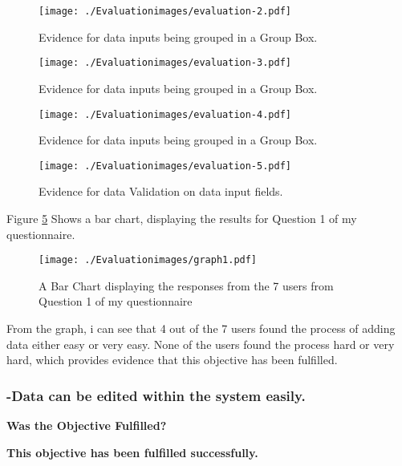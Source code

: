 \begin{figure}[H]
\caption{Evidence for data inputs being grouped in a Group Box.} \label{fig:evaluation-2}
\hfill\texttt{[image: ./Evaluationimages/evaluation-2.pdf]}
\end{figure}

\begin{figure}[H]
\caption{Evidence for data inputs being grouped in a Group Box.} \label{fig:evaluation-3}
\hfill\texttt{[image: ./Evaluationimages/evaluation-3.pdf]}
\end{figure}

\begin{figure}[H]
\caption{Evidence for data inputs being grouped in a Group Box.} \label{fig:evaluation-4}
\hfill\texttt{[image: ./Evaluationimages/evaluation-4.pdf]}
\end{figure}

\begin{figure}[H]
\caption{Evidence for data Validation on data input fields.} \label{fig:evaluation-5}
\hfill\texttt{[image: ./Evaluationimages/evaluation-5.pdf]}
\end{figure}

\pagebreak

Figure \ref{graph1} Shows a bar chart, displaying the results for Question 1 of my questionnaire.

\begin{figure}[H]
\caption{A Bar Chart displaying the responses from the 7 users from Question 1 of my questionnaire} \label{graph1}
\hfill\texttt{[image: ./Evaluationimages/graph1.pdf]}
\end{figure}

From the graph, i can see that 4 out of the 7 users found the process of adding data either easy or very easy. None of the users found the process hard or very hard, which provides evidence that this objective has been fulfilled.





\pagebreak
\label{edit}
\subsubsection{-Data can be edited within the system easily.}
\textbf{Was the Objective Fulfilled?} \newline

\textbf{\large{This objective has been fulfilled successfully.}}

